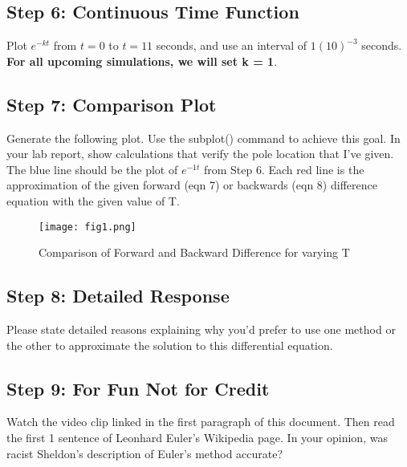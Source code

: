 \documentclass[10pt,a4paper]{article}
\begin{document}
\subsection*{Step 6: Continuous Time Function}
Plot $e^{-kt}$ from $t=0$ to $t=11$ seconds, and use an interval of $1(10)^{-3}$ seconds. \textbf{For all upcoming simulations, we will set k = 1}. 
\subsection*{Step 7: Comparison Plot}
Generate the following plot.  Use the subplot() command to achieve this goal.  In your lab report, show calculations that verify the pole location that I've given. The blue line should be the plot of $e^{-1t}$ from Step 6.  Each red line is the approximation of the given forward (eqn 7) or backwards (eqn 8) difference equation with the given value of T.
\begin{figure}[h!]
\centering
\texttt{[image: fig1.png]}
\caption{Comparison of Forward and Backward Difference for varying T}
\label{f:datarates}
\end{figure}
\subsection*{Step 8: Detailed Response}
Please state detailed reasons explaining why you'd prefer to use one method or the other to approximate the solution to this differential equation.
\subsection*{Step 9: For Fun Not for Credit}
Watch the video clip linked in the first paragraph of this document.  Then read the first 1 sentence of Leonhard Euler's Wikipedia page.  In your opinion, was racist Sheldon's description of Euler's method accurate?
\end{document}
